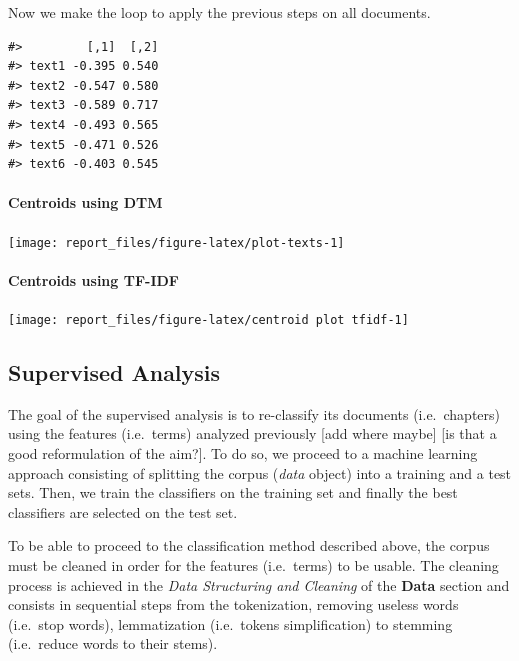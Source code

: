 \documentclass[
]{article}
\begin{document}
Now we make the loop to apply the previous steps on all documents.

\begin{verbatim}
#>         [,1]  [,2]
#> text1 -0.395 0.540
#> text2 -0.547 0.580
#> text3 -0.589 0.717
#> text4 -0.493 0.565
#> text5 -0.471 0.526
#> text6 -0.403 0.545
\end{verbatim}

\hypertarget{centroids-using-dtm}{%
\paragraph{Centroids using DTM}\label{centroids-using-dtm}}

\begin{center}\texttt{[image: report\_files/figure-latex/plot-texts-1]} \end{center}

\hypertarget{centroids-using-tf-idf}{%
\paragraph{Centroids using TF-IDF}\label{centroids-using-tf-idf}}

\begin{center}\texttt{[image: report\_files/figure-latex/centroid plot tfidf-1]} \end{center}

\hypertarget{supervised-analysis}{%
\subsection{Supervised Analysis}\label{supervised-analysis}}

The goal of the supervised analysis is to re-classify its documents
(i.e.~chapters) using the features (i.e.~terms) analyzed previously
{[}add where maybe{]} {[}is that a good reformulation of the aim?{]}. To
do so, we proceed to a machine learning approach consisting of splitting
the corpus (\emph{data} object) into a training and a test sets. Then,
we train the classifiers on the training set and finally the best
classifiers are selected on the test set.

To be able to proceed to the classification method described above, the
corpus must be cleaned in order for the features (i.e.~terms) to be
usable. The cleaning process is achieved in the \emph{Data Structuring
and Cleaning} of the \textbf{Data} section and consists in sequential
steps from the tokenization, removing useless words (i.e.~stop words),
lemmatization (i.e.~tokens simplification) to stemming (i.e.~reduce
words to their stems).
\end{document}
